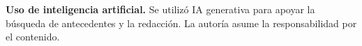 \begingroup
\par\bigskip
\begingroup
\footnotesize
{}
{}
\textbf{Uso de inteligencia artificial.} Se utilizó IA generativa para apoyar la búsqueda de antecedentes y la redacción. La autoría asume la responsabilidad por el contenido.
\par
\endgroup
\par\endgroup
